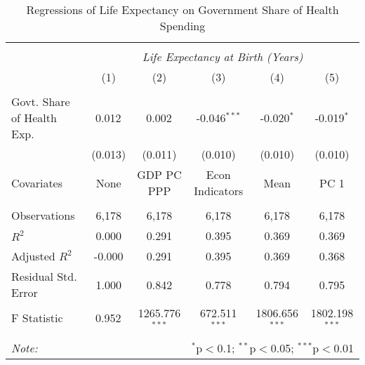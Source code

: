 \begin{table}[!htbp] \centering
  \caption{Regressions of Life Expectancy on Government Share of Health Spending \label{main_regs}}
\begin{tabular}{@{\extracolsep{5pt}}lccccc}
\\[-1.8ex]\hline
\hline \\[-1.8ex]
& \multicolumn{5}{c}{\textit{Life Expectancy at Birth (Years)}} \
\cr \
\\[-1.8ex] & (1) & (2) & (3) & (4) & (5) \\
\hline \\[-1.8ex]
 Govt. Share of Health Exp. & 0.012$^{}$ & 0.002$^{}$ & -0.046$^{***}$ & -0.020$^{*}$ & -0.019$^{*}$ \\
  & (0.013) & (0.011) & (0.010) & (0.010) & (0.010) \\
 Covariates & None & GDP PC PPP & Econ Indicators & Mean & PC 1 \\
\hline \\[-1.8ex]
 Observations & 6,178 & 6,178 & 6,178 & 6,178 & 6,178 \\
 $R^2$ & 0.000 & 0.291 & 0.395 & 0.369 & 0.369 \\
 Adjusted $R^2$ & -0.000 & 0.291 & 0.395 & 0.369 & 0.368 \\
 Residual Std. Error & 1.000 & 0.842 & 0.778 & 0.794 & 0.795  \\
 F Statistic & 0.952$^{}$  & 1265.776$^{***}$  & 672.511$^{***}$  & 1806.656$^{***}$  & 1802.198$^{***}$  \\
\hline
\hline \\[-1.8ex]
\textit{Note:} & \multicolumn{5}{r}{$^{*}$p$<$0.1; $^{**}$p$<$0.05; $^{***}$p$<$0.01} \\
\end{tabular}
\end{table}